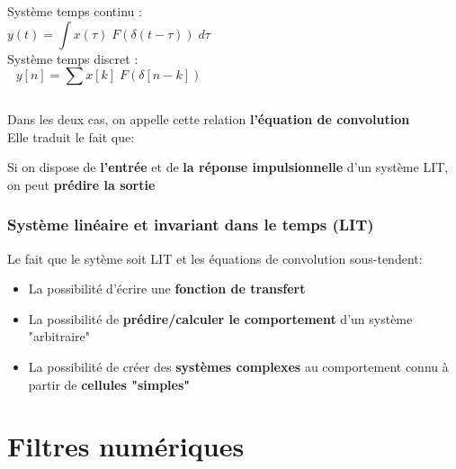 \documentclass{beamer}
\begin{document}
\begin{frame}
\frametitle{}
\begin{columns}
\column{60mm}
Système temps continu :  
\[y(t) =  \int  x(\tau)  \; F(\delta(t-\tau)) \; d\tau\]
\column{60mm}
Système temps discret :
\[ y[n] =  \sum x[k] \;F(\delta[n-k]) \]
\end{columns}
\vspace{0.5cm}
Dans les deux cas, on appelle cette relation \textbf{l'équation de convolution} \\
\vspace{1cm}
Elle traduit le fait que:\\

\begin{block}{}
Si on dispose de \textbf{l'entrée} et de \textbf{la réponse impulsionnelle} d'un système LIT, on peut \textbf{prédire la sortie} 
\end{block}
\end{frame}

\begin{frame}
\frametitle{Système linéaire et invariant dans le temps (LIT)}
Le fait que le sytème soit LIT et les équations de convolution sous-tendent: \\
\vspace{1cm}
\begin{itemize}
\item La possibilité d'écrire une \textbf{fonction de transfert}
\vspace{0.3cm}
\item La possibilité de \textbf{prédire/calculer le comportement} d'un système "arbitraire"
\vspace{0.3cm}
\item La possibilité de créer des \textbf{systèmes complexes} au comportement connu à partir de \textbf{cellules "simples"}
\end{itemize}

\end{frame} 

\section{Filtres numériques}
\end{document}

